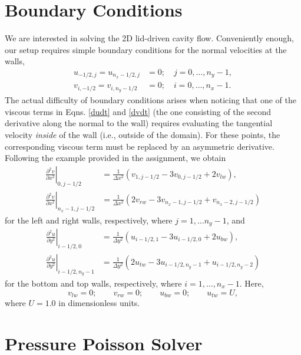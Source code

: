 \documentclass[11pt]{article}
\begin{document}
\section{Boundary Conditions}

We are interested in solving the 2D lid-driven cavity flow. Conveniently enough, our setup requires simple boundary conditions for the normal velocities at the walls,
\begin{align}
u_{-1/2,j} = u_{n_x - 1/2,j} &= 0;\quad j = 0,\hdots,n_y-1,\\
v_{i,-1/2} = v_{i,n_y - 1/2} &= 0;\quad i = 0,\hdots,n_x-1.
\end{align}
The actual difficulty of boundary conditions arises when noticing that one of the viscous terms in Eqns. \eqref{dudt} and \eqref{dvdt} (the one consisting of the second derivative along the normal to the wall) requires evaluating the tangential velocity \emph{inside} of the wall (i.e., outside of the domain). For these points, the corresponding viscous term must be replaced by an asymmetric derivative. Following the example provided in the assignment, we obtain
\begin{align}
\left.\frac{\partial^2 v}{\partial x^2}\right|_{0,j-1/2} 
&= \frac{1}{\Delta x^2}\left( v_{1,j-1/2} - 3v_{0,j-1/2} + 2v_{lw} \right),\\
\left.\frac{\partial^2 v}{\partial x^2}\right|_{n_x-1,j-1/2}
&= \frac{1}{\Delta x^2}\left( 2v_{rw} - 3v_{n_x-1,j-1/2} + v_{n_x-2,j-1/2} \right)
\end{align}
for the left and right walls, respectively, where $j=1,\hdots n_y-1$, and 
\begin{align}
\left.\frac{\partial^2 u}{\partial y^2}\right|_{i-1/2,0}
&= \frac{1}{\Delta y^2}\left( u_{i-1/2,1} - 3u_{i-1/2,0} + 2u_{bw} \right),\\
\left.\frac{\partial^2 u}{\partial y^2}\right|_{i-1/2,n_y-1} 
&= \frac{1}{\Delta y^2}\left( 2u_{tw} - 3u_{i-1/2,n_y-1} + u_{i-1/2,n_y-2} \right)
\end{align}
for the bottom and top walls, respectively, where $i = 1,\hdots, n_x-1$. Here,
\begin{equation}
v_{lw} = 0;\qquad v_{rw} = 0;\qquad u_{bw} = 0;\qquad u_{tw} = U,
\end{equation}
where $U = 1.0$ in dimensionless units.

\section{Pressure Poisson Solver}
\end{document}
